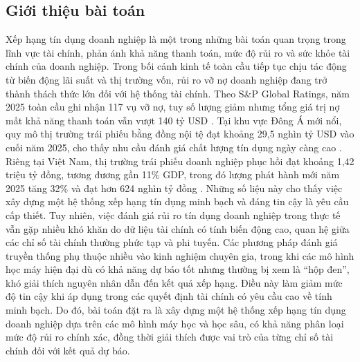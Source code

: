 \documentclass[10pt,twoside]{article}
\begin{document}
\subsection{Giới thiệu bài toán}
Xếp hạng tín dụng doanh nghiệp là một trong những bài toán quan trọng trong lĩnh vực tài chính, phản ánh khả năng thanh toán, mức độ rủi ro và sức khỏe tài chính của doanh nghiệp. Trong bối cảnh kinh tế toàn cầu tiếp tục chịu tác động từ biến động lãi suất và thị trường vốn, rủi ro vỡ nợ doanh nghiệp đang trở thành thách thức lớn đối với hệ thống tài chính. Theo S\&P Global Ratings, năm 2025 toàn cầu ghi nhận 117 vụ vỡ nợ, tuy số lượng giảm nhưng tổng giá trị nợ mất khả năng thanh toán vẫn vượt 140 tỷ USD \cite{spglobal_2026_global_defaults}. Tại khu vực Đông Á mới nổi, quy mô thị trường trái phiếu bằng đồng nội tệ đạt khoảng 29,5 nghìn tỷ USD vào cuối năm 2025, cho thấy nhu cầu đánh giá chất lượng tín dụng ngày càng cao \cite{asian_development_bank_asia_2017}. Riêng tại Việt Nam, thị trường trái phiếu doanh nghiệp phục hồi đạt khoảng 1,42 triệu tỷ đồng, tương đương gần 11\% GDP, trong đó lượng phát hành mới năm 2025 tăng 32\% và đạt hơn 624 nghìn tỷ đồng \cite{visrating_2026_corporate_bond_q1}. Những số liệu này cho thấy việc xây dựng một hệ thống xếp hạng tín dụng minh bạch và đáng tin cậy là yêu cầu cấp thiết. Tuy nhiên, việc đánh giá rủi ro tín dụng doanh nghiệp trong thực tế vẫn gặp nhiều khó khăn do dữ liệu tài chính có tính biến động cao, quan hệ giữa các chỉ số tài chính thường phức tạp và phi tuyến. Các phương pháp đánh giá truyền thống phụ thuộc nhiều vào kinh nghiệm chuyên gia, trong khi các mô hình học máy hiện đại dù có khả năng dự báo tốt nhưng thường bị xem là “hộp đen”, khó giải thích nguyên nhân dẫn đến kết quả xếp hạng. Điều này làm giảm mức độ tin cậy khi áp dụng trong các quyết định tài chính có yêu cầu cao về tính minh bạch. Do đó, bài toán đặt ra là xây dựng một hệ thống xếp hạng tín dụng doanh nghiệp dựa trên các mô hình máy học và học sâu, có khả năng phân loại mức độ rủi ro chính xác, đồng thời giải thích được vai trò của từng chỉ số tài chính đối với kết quả dự báo.
\end{document}
